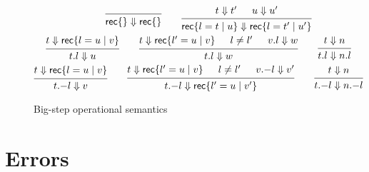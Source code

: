 \begin{figure}
\begin{gather*}
    \qquad
    \begin{prooftree}
      \infer0{\RecordLit \{ \} \Downarrow \RecordLit \{ \}}
    \end{prooftree}
    \qquad
    \begin{prooftree}
      \hypo{t \Downarrow t'}
      \hypo{u \Downarrow u'}
      \infer2{\RecordLit \{ l = t \mid u \}
        \Downarrow \RecordLit \{ l = t' \mid u' \}}
    \end{prooftree}
    \\
    \begin{prooftree}
      \hypo{t \Downarrow \RecordLit \{ l = u \mid v \}}
      \infer1{t.l \Downarrow u}
    \end{prooftree}
    \qquad
    \begin{prooftree}
      \hypo{t \Downarrow \RecordLit \{ l' = u \mid v \}}
      \hypo{l \neq l'}
      \hypo{v.l \Downarrow w}
      \infer3{t.l \Downarrow w}
    \end{prooftree}
    \qquad
    \begin{prooftree}
      \hypo{t \Downarrow n}
      \infer1{t.l \Downarrow n.l}
    \end{prooftree}
    \\
    \begin{prooftree}
      \hypo{t \Downarrow \RecordLit \{ l = u \mid v \}}
      \infer1{t \RecordRestr l \Downarrow v}
    \end{prooftree}
    \qquad
    \begin{prooftree}
      \hypo{t \Downarrow \RecordLit \{ l' = u \mid v \}}
      \hypo{l \neq l'}
      \hypo{v \RecordRestr l \Downarrow v'}
      \infer3{t \RecordRestr l \Downarrow \RecordLit \{ l' = u \mid v' \}}
    \end{prooftree}
    \qquad
    \begin{prooftree}
      \hypo{t \Downarrow n}
      \infer1{t \RecordRestr l \Downarrow n \RecordRestr l}
    \end{prooftree}
  \end{gather*}
  \caption{Big-step operational semantics}\label{fig:big-step}
\end{figure}

\section{Errors}

